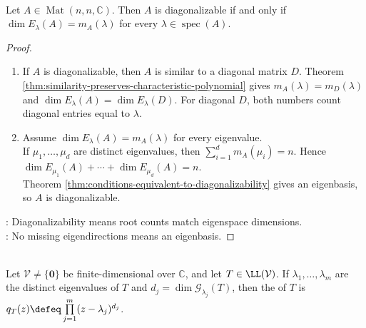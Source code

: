 \begin{theorem} \label{thm:diagonalizable-iff-algebraic-geometric-multiplicities-match} \\
Let $A\in\operatorname{Mat}(n,n,\mathbb{C})$. Then $A$ is diagonalizable if and only if $\dim E_{\lambda}(A)=m_A(\lambda)$ for every $\lambda\in\operatorname{spec}(A)$.
\begin{proof}
\begin{enumerate}[label=\roman*.]
\setlength{\itemsep}{0pt}
\item[$(\Rightarrow)$] If $A$ is diagonalizable, then $A$ is similar to a diagonal matrix $D$. Theorem \ref{thm:similarity-preserves-characteristic-polynomial} gives $m_A(\lambda)=m_D(\lambda)$ and $\dim E_{\lambda}(A)=\dim E_{\lambda}(D)$. For diagonal $D$, both numbers count diagonal entries equal to $\lambda$.
\item[$(\Leftarrow)$] Assume $\dim E_{\lambda}(A)=m_A(\lambda)$ for every eigenvalue.\\
If $\mu_1,\ldots,\mu_d$ are distinct eigenvalues, then $\sum\limits_{i=1}^{d}m_A(\mu_i)=n$. Hence $\dim E_{\mu_1}(A)+\cdots+\dim E_{\mu_d}(A)=n$.\\
Theorem \ref{thm:conditions-equivalent-to-diagonalizability} gives an eigenbasis, so $A$ is diagonalizable.
\end{enumerate}
: Diagonalizability means root counts match eigenspace dimensions.\\
: No missing eigendirections means an eigenbasis.
\end{proof}
\end{theorem}

\begin{definition} \label{def:operator-characteristic-polynomial} \\
Let $\mathcal{V}\neq\{\mathbf{0}\}$ be finite-dimensional over $\mathbb{C}$, and let $T\in\LL(\mathcal{V})$. If $\lambda_1,\ldots,\lambda_m$ are the distinct eigenvalues of $T$ and $d_j=\dim \mathcal{G}_{\lambda_j}(T)$, then the  of $T$ is $q_T(z)\defeq\prod\limits_{j=1}^{m}(z-\lambda_j)^{d_j}$.
\end{definition}


